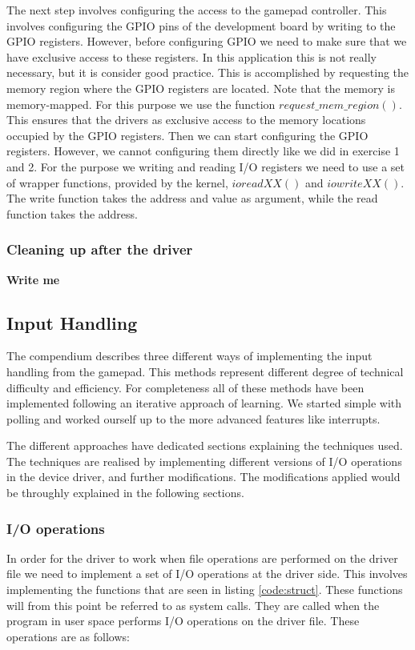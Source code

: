 The next step involves configuring the access to the gamepad controller. This involves configuring the GPIO pins of the development board by writing to the GPIO registers. However, before configuring GPIO we need to make sure that we have exclusive access to these registers. In this application this is not really necessary, but it is consider good practice. This is accomplished by requesting the memory region where the GPIO registers are located. Note that the memory is memory-mapped. For this purpose we use the function $request\_mem\_region()$. This ensures that the drivers as exclusive access to the memory locations occupied by the GPIO registers. Then we can start configuring the GPIO registers. However, we cannot configuring them directly like we did in exercise 1 and 2. For the purpose we writing and reading I/O registers we need to use a set of wrapper functions, provided by the kernel, $ioreadXX()$ and $iowriteXX()$. The write function takes the address and value as argument, while the read function takes the address. 



\subsubsection{Cleaning up after the driver}
{\bf Write me}





\subsection{Input Handling}
The compendium describes three different ways of implementing the input handling from the gamepad. This methods represent different degree of technical difficulty and efficiency. For completeness all of these methods have been implemented following an iterative approach of learning. We started simple with polling and worked ourself up to the more advanced features like interrupts.

The different approaches have dedicated sections explaining the techniques used. The techniques are realised by implementing different versions of I/O operations in the device driver, and further modifications. The modifications applied would be throughly explained in the following sections. 


\subsubsection{I/O operations}
In order for the driver to work when file operations are performed on the driver file we need to implement a set of I/O operations at the driver side. This involves implementing the functions that are seen in listing \ref{code:struct}. These functions will from this point be referred to as system calls. They are called when the program in user space performs I/O operations on the driver file. These operations are as follows: 

